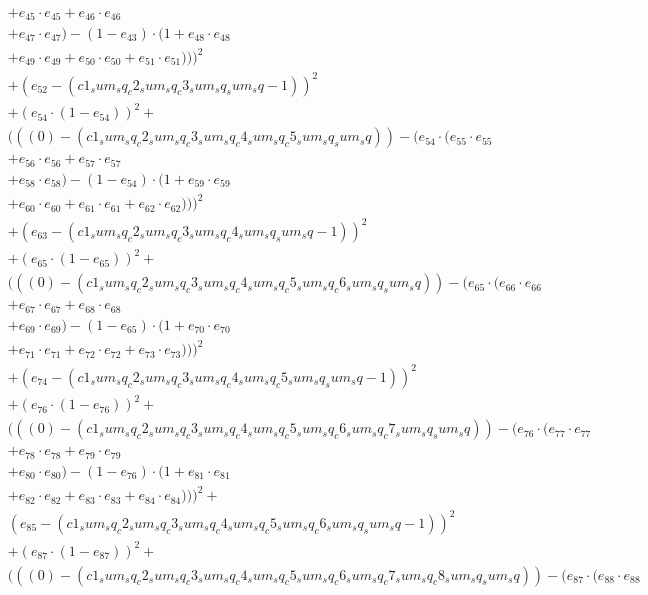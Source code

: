 \documentclass[10pt, a4paper]{article}
\begin{document}
\begin{align*}
& + e_{45} \cdot e_{45} + e_{46} \cdot e_{46} \\
& + e_{47} \cdot e_{47}) - (1 - e_{43}) \cdot (1 + e_{48} \cdot e_{48} \\
& + e_{49} \cdot e_{49} + e_{50} \cdot e_{50} + e_{51} \cdot e_{51})))^{2} \\
& + (e_{52} - (c1_sum_sq_c2_sum_sq_c3_sum_sq_sum_sq - 1))^{2} \\
& + (e_{54} \cdot (1 - e_{54}))^{2} + \\
& (((0) - (c1_sum_sq_c2_sum_sq_c3_sum_sq_c4_sum_sq_c5_sum_sq_sum_sq)) - (e_{54} \cdot (e_{55} \cdot e_{55} \\
& + e_{56} \cdot e_{56} + e_{57} \cdot e_{57} \\
& + e_{58} \cdot e_{58}) - (1 - e_{54}) \cdot (1 + e_{59} \cdot e_{59} \\
& + e_{60} \cdot e_{60} + e_{61} \cdot e_{61} + e_{62} \cdot e_{62})))^{2} \\
& + (e_{63} - (c1_sum_sq_c2_sum_sq_c3_sum_sq_c4_sum_sq_sum_sq - 1))^{2} \\
& + (e_{65} \cdot (1 - e_{65}))^{2} + \\
& (((0) - (c1_sum_sq_c2_sum_sq_c3_sum_sq_c4_sum_sq_c5_sum_sq_c6_sum_sq_sum_sq)) - (e_{65} \cdot (e_{66} \cdot e_{66} \\
& + e_{67} \cdot e_{67} + e_{68} \cdot e_{68} \\
& + e_{69} \cdot e_{69}) - (1 - e_{65}) \cdot (1 + e_{70} \cdot e_{70} \\
& + e_{71} \cdot e_{71} + e_{72} \cdot e_{72} + e_{73} \cdot e_{73})))^{2} \\
& + (e_{74} - (c1_sum_sq_c2_sum_sq_c3_sum_sq_c4_sum_sq_c5_sum_sq_sum_sq - 1))^{2} \\
& + (e_{76} \cdot (1 - e_{76}))^{2} + \\
& (((0) - (c1_sum_sq_c2_sum_sq_c3_sum_sq_c4_sum_sq_c5_sum_sq_c6_sum_sq_c7_sum_sq_sum_sq)) - (e_{76} \cdot (e_{77} \cdot e_{77} \\
& + e_{78} \cdot e_{78} + e_{79} \cdot e_{79} \\
& + e_{80} \cdot e_{80}) - (1 - e_{76}) \cdot (1 + e_{81} \cdot e_{81} \\
& + e_{82} \cdot e_{82} + e_{83} \cdot e_{83} + e_{84} \cdot e_{84})))^{2} + \\
& (e_{85} - (c1_sum_sq_c2_sum_sq_c3_sum_sq_c4_sum_sq_c5_sum_sq_c6_sum_sq_sum_sq - 1))^{2} \\
& + (e_{87} \cdot (1 - e_{87}))^{2} + \\
& (((0) - (c1_sum_sq_c2_sum_sq_c3_sum_sq_c4_sum_sq_c5_sum_sq_c6_sum_sq_c7_sum_sq_c8_sum_sq_sum_sq)) - (e_{87} \cdot (e_{88} \cdot e_{88} \\

\end{align*}
\end{document}
